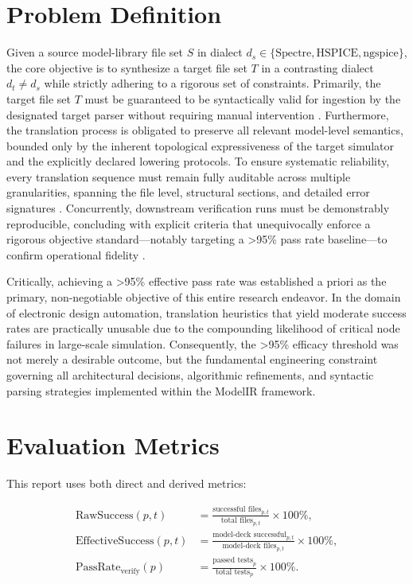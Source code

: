 \documentclass[12pt,a4paper,oneside]{report}
\begin{document}
\section{Problem Definition}
Given a source model-library file set $S$ in dialect $d_s \in \{\text{Spectre},\text{HSPICE},\text{ngspice}\}$, the core objective is to synthesize a target file set $T$ in a contrasting dialect $d_t \neq d_s$ while strictly adhering to a rigorous set of constraints. Primarily, the target file set $T$ must be guaranteed to be syntactically valid for ingestion by the designated target parser without requiring manual intervention \cite{eda_standards}. Furthermore, the translation process is obligated to preserve all relevant model-level semantics, bounded only by the inherent topological expressiveness of the target simulator and the explicitly declared lowering protocols. To ensure systematic reliability, every translation sequence must remain fully auditable across multiple granularities, spanning the file level, structural sections, and detailed error signatures \cite{translation_limits}. Concurrently, downstream verification runs must be demonstrably reproducible, concluding with explicit criteria that unequivocally enforce a rigorous objective standard—notably targeting a >95\% pass rate baseline—to confirm operational fidelity \cite{llm_eda_dataset,autospice}.

Critically, achieving a >95\% effective pass rate was established a priori as the primary, non-negotiable objective of this entire research endeavor. In the domain of electronic design automation, translation heuristics that yield moderate success rates are practically unusable due to the compounding likelihood of critical node failures in large-scale simulation. Consequently, the >95\% efficacy threshold was not merely a desirable outcome, but the fundamental engineering constraint governing all architectural decisions, algorithmic refinements, and syntactic parsing strategies implemented within the ModelIR framework.

\section{Evaluation Metrics}
This report uses both direct and derived metrics:

\begin{align}
\text{RawSuccess}(p,t) &= \frac{\text{successful files}_{p,t}}{\text{total files}_{p,t}} \times 100\%, \\
\text{EffectiveSuccess}(p,t) &= \frac{\text{model-deck successful}_{p,t}}{\text{model-deck files}_{p,t}} \times 100\%, \\
\text{PassRate}_{\text{verify}}(p) &= \frac{\text{passed tests}_p}{\text{total tests}_p} \times 100\%.
\end{align}
\end{document}
